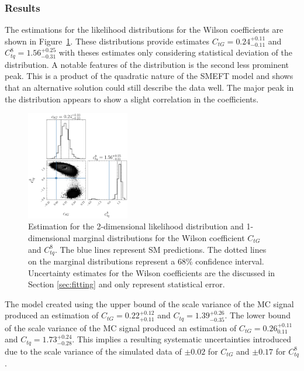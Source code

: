 \documentclass[a4paper,11pt]{article}
\begin{document}
\subsubsection{Results}

The estimations for the likelihood distributions for the Wilson coefficients are shown in Figure~\ref{fig:corner_1D_2OP}.
These distributions provide estimates $C_{tG}=0.24^{+0.11}_{-0.11}$ and $C_{tq}^{8}=1.56^{+0.25}_{-0.31}$ with theses estimates only considering statistical deviation of the distribution.
A notable features of the distribution is the second less prominent peak.
This is a product of the quadratic nature of the SMEFT model and shows that an alternative solution could still describe the data well.
The major peak in the distribution appears to show a slight correlation in the coefficients.

\begin{figure}[htb]
    \centering
    \includegraphics[width=0.4\textwidth]{plots/ATLAS-ctg-ctq8_1D_2OP.png}
    \caption{Estimation for the 2-dimensional likelihood distribution and 1-dimensional marginal distributions for the Wilson coefficient $C_{tG}$ and $C_{tq}^{8}$. The blue lines represent SM predictions. The dotted lines on the marginal distributions represent a 68\% confidence interval. Uncertainty estimates for the Wilson coefficients are the discussed in Section \ref{sec:fitting} and only represent statistical error.}
    \label{fig:corner_1D_2OP}
\end{figure}

The model created using the upper bound of the scale variance of the MC signal produced an estimation of $C_{tG}=0.22^{+0.12}_{+0.11}$ and $C_{tq}=1.39_{-0.35}^{+0.26}$.
The lower bound of the scale variance of the MC signal produced an estimation of $C_{tG}=0.26^{+0.11}_{0.11}$ and $C_{tq}=1.73_{-0.28}^{+0.24}$.
This implies a resulting systematic uncertainties introduced due to the scale variance of the simulated data of $\pm0.02$ for $C_{tG}$ and $\pm0.17$ for $C_{tq}^{8}$.
\end{document}
